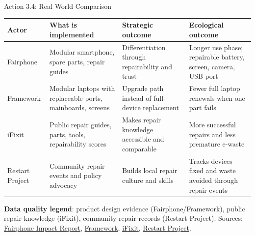 \documentclass[aspectratio=169]{beamer}
\begin{document}

\begin{frame}{Action 3.4: Real World Comparison}
\scriptsize
\begin{tabular}{p{2.0cm}p{3.2cm}p{3.2cm}p{3.2cm}}
\toprule
Actor & What is implemented & Strategic outcome & Ecological outcome \\
\midrule
Fairphone & Modular smartphone, spare parts, repair guides & Differentiation through repairability and trust & Longer use phase; repairable battery, screen, camera, USB port \\
Framework & Modular laptops with replaceable ports, mainboards, screens & Upgrade path instead of full-device replacement & Fewer full laptop renewals when one part fails \\
iFixit & Public repair guides, parts, tools, repairability scores & Makes repair knowledge accessible and comparable & More successful repairs and less premature e-waste \\
Restart Project & Community repair events and policy advocacy & Builds local repair culture and skills & Tracks devices fixed and waste avoided through repair events \\
\bottomrule
\end{tabular}

\vspace{0.15cm}
\textbf{Data quality legend}: product design evidence (Fairphone/Framework), public repair knowledge (iFixit), community repair records (Restart Project).
\vspace{0.08cm}
\tiny Sources: \href{https://www.fairphone.com/en/impact-report/}{Fairphone Impact Report}, \href{https://frame.work}{Framework}, \href{https://www.ifixit.com}{iFixit}, \href{https://therestartproject.org}{Restart Project}.
\end{frame}

\end{document}
